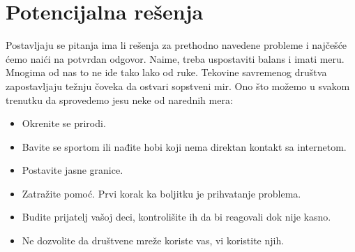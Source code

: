 \documentclass[a4paper]{article}
\begin{document}
{		\section{Potencijalna rešenja}	
		 Postavljaju se pitanja ima li rešenja za prethodno navedene probleme i najčešće ćemo naići na potvrdan odgovor. Naime, treba uspostaviti balans i imati meru. Mnogima od nas to ne ide tako lako od ruke. Tekovine savremenog društva zapostavljaju težnju čoveka da ostvari sopstveni mir. Ono što možemo u svakom trenutku da sprovedemo jesu neke od narednih mera:
		 \begin{itemize}
		 	\item Okrenite se prirodi.
		 	\item Bavite se sportom ili nađite hobi koji nema direktan kontakt sa internetom.
		 	\item Postavite jasne granice.
		 	\item Zatražite pomoć. Prvi korak ka boljitku je prihvatanje problema.
		 	\item Budite prijatelj vašoj deci, kontrolišite ih da bi reagovali dok nije kasno.
		 	\item Ne dozvolite da društvene mreže koriste vas, vi koristite njih.
		 			 	
		 \end{itemize}  
		
	
	
		\appendix
		
		\iffalse
		 
		
		\fi
		
		\begin{thebibliography}{9}
			

\end{thebibliography}}
\end{document}
